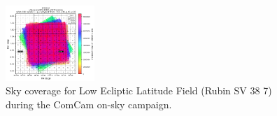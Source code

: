 \begin{figure}
    \begin{center}
      \includegraphics[width=0.3\textwidth]{observations_figures/showVisit_DM-30993_LSSTComCam_10463.png}
    \end{center}
    \caption{Sky coverage for Low Ecliptic Latitude Field (Rubin SV 38 7) during the ComCam on-sky campaign.}
    \label{fig:comcam_ecliptic_coverage}
\end{figure}

